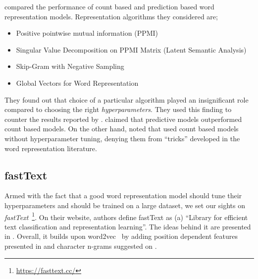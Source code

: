 \textcite{levy_improving_2015} compared the performance of count based and prediction based word representation models.
Representation algorithms they considered are;
\begin{itemize}
    \item Positive pointwise mutual information (PPMI)~\cite{church_word_1990, bullinaria_extracting_2007}
    \item Singular Value Decomposition on PPMI Matrix (Latent Semantic Analysis)~\cite{deerwester_indexing_1990}
    \item Skip-Gram with Negative Sampling~\cite{mikolov_distributed_2013}
    \item Global Vectors for Word Representation~\cite{pennington_glove_2014}
\end{itemize}
They found out that choice of a particular algorithm played an insignificant role compared to choosing the right \emph{hyperparameters}.
They used this finding to counter the results reported by \textcite{baroni_dont_2014}.
\citeauthor{baroni_dont_2014} claimed that predictive models outperformed count based models.
On the other hand, \citeauthor{levy_improving_2015} noted that \citeauthor{baroni_dont_2014} used count based models without hyperparameter tuning, denying them from \enquote{tricks} developed in the word representation literature.

\subsection{fastText}%
\label{sub:fasttext}

Armed with the fact that a good word representation model should tune their hyperparameters and should be trained on a large dataset, we set our sights on \emph{fastText}~\footnote{\url{https://fasttext.cc/}}.
On their website, authors define fastText as (a) \enquote{Library for efficient text classification and representation learning}.
The ideas behind it are presented in \textcite{mikolov2018advances}.
Overall, it builds upon word2vec~\cite{mikolov_distributed_2013} by adding position dependent features presented in \textcite{mnih_learning_2013} and character n-grams suggested on \textcite{bojanowski_enriching_2016}.

